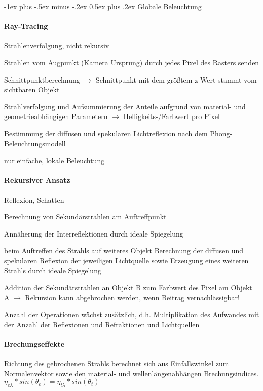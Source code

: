 \documentclass[landscape]{article}
\makeatletter
\renewcommand{\section}{\@startsection{section}{1}{0mm}%
                                {-1ex plus -.5ex minus -.2ex}%
                                {0.5ex plus .2ex}%
                                {\normalfont\large\bfseries}}
\makeatother
\begin{document}
\begin{multicols}{3}
  \section{Globale Beleuchtung}
  \paragraph{Ray-Tracing}
  Strahlenverfolgung, nicht rekursiv
  \begin{itemize*}
    \item Strahlen vom Augpunkt (Kamera Ursprung) durch jedes Pixel des Rasters senden
    \item Schnittpunktberechnung $\rightarrow$ Schnittpunkt mit dem größtem z-Wert stammt vom sichtbaren Objekt
    \item Strahlverfolgung und Aufsummierung der Anteile aufgrund von material- und geometrieabhängigen Parametern $\rightarrow$ Helligkeits-/Farbwert pro Pixel
    \item Bestimmung der diffusen und spekularen Lichtreflexion nach dem Phong-Beleuchtungsmodell
    \item nur einfache, lokale Beleuchtung
  \end{itemize*}
  
  \paragraph{Rekursiver Ansatz}
  Reflexion, Schatten
  \begin{itemize*}
    \item Berechnung von Sekundärstrahlen am Auftreffpunkt
    \item Annäherung der Interreflektionen durch ideale Spiegelung
    \item beim Auftreffen des Strahls auf weiteres Objekt Berechnung der diffusen und spekularen Reflexion der jeweiligen Lichtquelle sowie Erzeugung eines weiteren Strahls durch ideale Spiegelung
    \item Addition der Sekundärstrahlen an Objekt B zum Farbwert des Pixel am Objekt A $\rightarrow$ Rekursion kann abgebrochen werden, wenn Beitrag vernachlässigbar!
    \item Anzahl der Operationen wächst zusätzlich, d.h. Multiplikation des Aufwandes mit der Anzahl der Reflexionen und Refraktionen und Lichtquellen
  \end{itemize*}
  
  \paragraph{Brechungseffekte}
  Richtung des gebrochenen Strahls berechnet sich aus Einfallswinkel zum Normalenvektor sowie den material- und wellenlängenabhängen Brechungsindices. $\eta_{e\lambda}*sin(\theta_e) = \eta_{t\lambda}*sin(\theta_t)$
  

\end{multicols}
\end{document}
